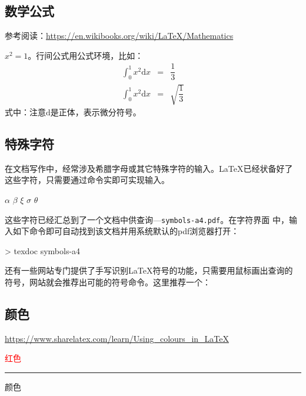 \subsection{数学公式}

参考阅读：\url{https://en.wikibooks.org/wiki/LaTeX/Mathematics}

\begin{codeout}
  $x^2=1$。行间公式用公式环境，比如：
  \begin{eqnarray}
    \int_{0}^{1} x^2 \mathrm{d}x & = & \dfrac{1}{3} \\
    \int_{0}^{1} x^2 \mathrm{d}x & = & \sqrt{ \dfrac{1}{3}} 
  \end{eqnarray}
  式中：注意$\mathrm{d}$是正体，表示微分符号。
\end{codeout}

\subsection{特殊字符}

在文档写作中，经常涉及希腊字母或其它特殊字符的输入。\LaTeX{}已经状备好了
这些字符，只需要通过命令实即可实现输入。

\begin{codeout}
  $\alpha$ $\beta$ $\xi$ $\sigma$ $\theta$
\end{codeout}

这些字符已经汇总到了一个文档中供查询—\texttt{symbols-a4.pdf}。在字符界面
中，输入如下命令即可自动找到该文档并用系统默认的pdf浏览器打开：

\begin{cmd}
  > texdoc symbols-a4
\end{cmd}

还有一些网站专门提供了手写识别\LaTeX{}符号的功能，只需要用鼠标画出查询的
符号，网站就会推荐出可能的符号命令。这里推荐一个：

\subsection{颜色}
\url{https://www.sharelatex.com/learn/Using_colours_in_LaTeX}

\begin{codeout}
  \textcolor{red}{红色}

  {\color{blue} \rule{\linewidth}{0.5mm}}

  \colorbox{BurntOrange}{颜色}
\end{codeout}

